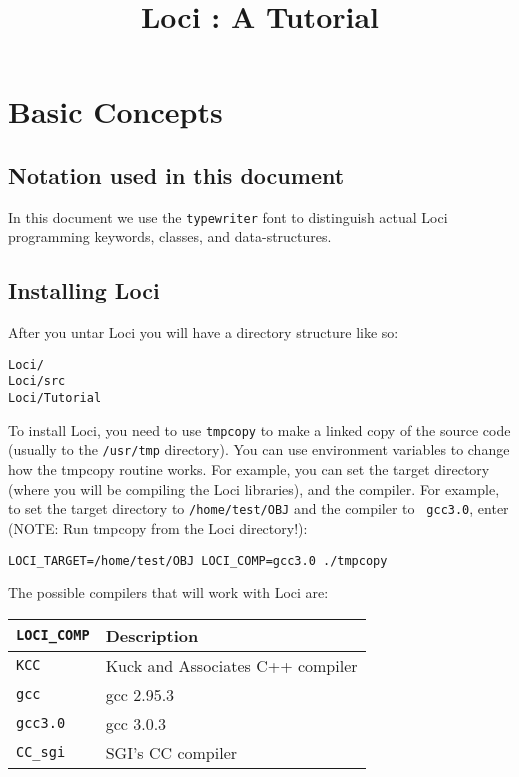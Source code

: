 \documentclass[10pt,epsf]{book}
\title { Loci : A Tutorial }
\begin{document}
\tableofcontents
\maketitle
\thispagestyle{empty}
\newpage
\setcounter{page}{1}




\chapter{ Basic Concepts }
\section{Notation used in this document}
In this document we use the {\tt typewriter} font to distinguish
actual Loci programming keywords, classes, and data-structures.
\section{ Installing Loci}
After you untar Loci you will have a directory structure like so:

\begin{verbatim}
Loci/
Loci/src
Loci/Tutorial
\end{verbatim}

To install Loci, you need to use {\tt tmpcopy} to make a linked copy
of the source code (usually to the {\tt /usr/tmp} directory).  You
can use environment variables to change how the tmpcopy routine works.
For example, you can set the target directory (where you will be
compiling the Loci libraries), and the compiler.  For example, to set
the target directory to {\tt /home/test/OBJ} and the compiler to {\tt
  gcc3.0}, enter (NOTE: Run tmpcopy from the Loci directory!):

\begin{verbatim}
LOCI_TARGET=/home/test/OBJ LOCI_COMP=gcc3.0 ./tmpcopy
\end{verbatim}

The possible compilers that will work with Loci are:  

\begin{center}
\begin{tabular}{|l|l|}
\hline
{\tt LOCI\_COMP} & Description \\
\hline
\hline
{\tt KCC }      & Kuck and Associates C++ compiler \\
{\tt gcc }      & gcc 2.95.3 \\
{\tt gcc3.0}    & gcc 3.0.3 \\
{\tt CC\_sgi}    & SGI's CC compiler \\
\hline
\end{tabular}
\end{center}
\end{document}
